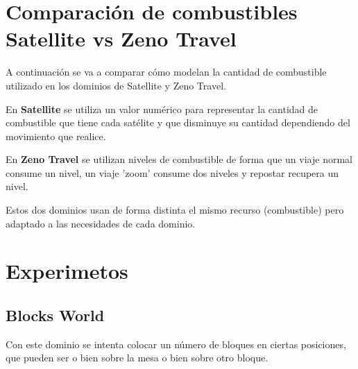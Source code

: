 \documentclass{uc3mpracticas}
\begin{document}
\section{Comparación de combustibles Satellite vs Zeno Travel}

A continuación se va a comparar cómo modelan la cantidad de combustible utilizado en los dominios de Satellite y Zeno Travel.

\vspace{2mm}

En \textbf{Satellite} se utiliza un valor numérico para representar la cantidad de combustible que tiene cada satélite y que disminuye su cantidad dependiendo del movimiento que realice.

\vspace{2mm}

En \textbf{Zeno Travel} se utilizan niveles de combustible de forma que un viaje normal consume un nivel, un viaje 'zoom' consume dos niveles y repostar recupera un nivel.

\vspace{2mm}

Estos dos dominios usan de forma distinta el mismo recurso (combustible) pero adaptado a las necesidades de cada dominio.



\section{Experimetos}

\subsection{Blocks World}

Con este dominio se intenta colocar un número de bloques en ciertas posiciones, que pueden ser o bien sobre la mesa o bien sobre otro bloque.
\end{document}
